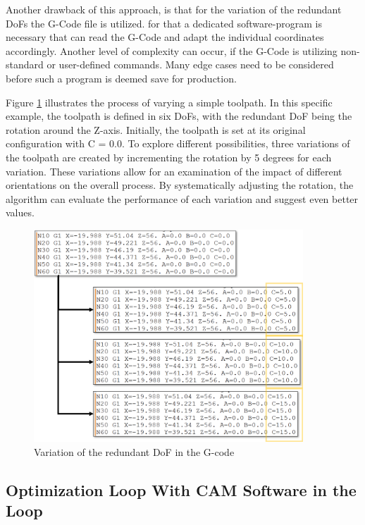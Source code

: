 Another drawback of this approach, is that for the variation of the redundant \acrshort{DoF}s the G-Code file is utilized. for that a dedicated software-program is necessary that can read the G-Code and adapt the individual coordinates accordingly. Another level of complexity can occur, if the G-Code is utilizing non-standard or user-defined commands. Many edge cases need to be considered before such a program is deemed save for production.       

Figure \ref{variation} illustrates the process of varying a simple toolpath. In this specific example, the toolpath is defined in six \acrshort{DoF}s, with the redundant \acrshort{DoF} being the rotation around the Z-axis. Initially, the toolpath is set at its original configuration with C = 0.0. To explore different possibilities, three variations of the toolpath are created by incrementing the rotation by 5 degrees for each variation. These variations allow for an examination of the impact of different orientations on the overall process. By systematically adjusting the rotation, the algorithm can evaluate the performance of each variation and suggest even better values.


\begin{figure}[H]
	\centerline{\includegraphics[width=0.9\textwidth]{figures/gcodevariation.png}}
	\caption{Variation of the redundant DoF in the G-code}
	\label{variation}
\end{figure}

\newpage
\subsection{Optimization Loop With CAM Software in the Loop}\label{CAMinloop}

